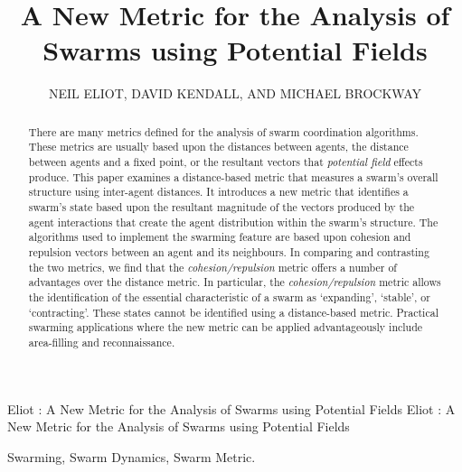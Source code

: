 \documentclass{ieeeaccess}
\begin{document}

\title{A New Metric for the Analysis of Swarms using Potential Fields}
\author{\uppercase{Neil Eliot},
\uppercase{David Kendall, and Michael Brockway}}
\address[1]{Northumbria University, Department of Computing and Information Sciences, 
Newcastle upon Tyne, NE1 8ST}

\markboth
{Eliot \headeretal: A New Metric for the Analysis of Swarms using Potential Fields}
{Eliot \headeretal: A New Metric for the Analysis of Swarms using Potential Fields}



\begin{abstract}
  There are many metrics defined for the analysis of swarm coordination
  algorithms. These metrics are usually based upon the distances between
  agents, the distance between agents and a fixed point, or the resultant vectors
  that \textit{potential field} effects produce. This paper examines a
  distance-based metric that measures a swarm's overall structure using
  inter-agent distances. It introduces a new metric that identifies a swarm's
  state based upon the resultant magnitude of the vectors produced by the
  agent interactions that create the agent distribution within the swarm's
  structure. The algorithms used to implement the swarming feature are based
  upon cohesion and repulsion vectors between an agent and its neighbours. In
  comparing and contrasting the two metrics, we find that the
  \textit{cohesion/repulsion} metric offers a number of advantages over the
  distance metric. In particular, the \textit{cohesion/repulsion} metric allows
  the identification of the essential characteristic of a swarm as `expanding',
  `stable', or `contracting'. These states cannot be identified using a
  distance-based metric. Practical swarming applications where the new metric
  can be applied advantageously include area-filling and reconnaissance.
\end{abstract}

\begin{keywords}
Swarming, Swarm Dynamics, Swarm Metric.
\end{keywords}
\end{document}

